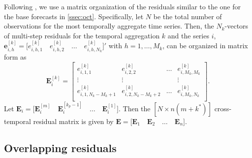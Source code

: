 \documentclass[12pt]{article}
\newcommand{\evet}{\bm{e}}
\newcommand{\Evet}{\bm{E}}
\theoremstyle{definition}
\begin{document}
Following \cite{difonzo2023}, we use a matrix organization of the residuals similar to the one for the base forecasts in \autoref{ssec:oct}. Specifically, let $N$ be the total number of observations for the most temporally aggregate time series. Then, the $N_k$-vectors of multi-step residuals for the temporal aggregation $k$ and the series $i$, $\evet_{i,h}^{[k]} =  \Big[e_{i,h,1}^{[k]} \quad e_{i,h,2}^{[k]} \quad \dots \quad e_{i,h,N_k}^{[k]}\Big]'$ with $h = 1,\dots, M_k$, can be organized in matrix form as
$$
	\Evet_i^{[k]} = \begin{bmatrix}
		e_{i,1,1}^{[k]}                     & e_{i,2,2}^{[k]}                     & \dots & e_{i,M_k,M_k}^{[k]} \\
		\vdots                            & \vdots                            &       & \vdots                  \\
		e_{i,1,N_k - M_k + 1}^{[k]} & e_{i,2,N_k - M_k + 2}^{[k]} & \dots & e_{i,M_k,N_k}^{[k]}         \\
	\end{bmatrix}.
$$
Let $\Evet_i = \Big[\Evet_i^{[m]} \quad \Evet_i^{[k_p-1]} \quad \dots \quad \Evet_i^{[1]}  \Big]$. Then the $[N \times n(m+k^\ast)]$ cross-temporal residual matrix is given by $
	\Evet = \Big[\Evet_1 \quad \Evet_2 \quad \dots \quad \Evet_n \Big]$.

\subsection{Overlapping residuals}\label{ssec:over_res}
\end{document}
